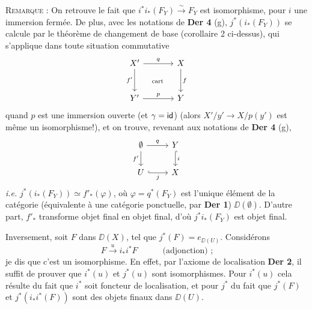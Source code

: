 \noindent\textsc{Remarque} : On retrouve le fait que $i^*i_*(F_Y) \overset{\sim}{\to} F_Y$ est isomorphisme, pour $i$ une immersion fermée. De plus, avec les notations de \textbf{Der 4} (g), $j^*(i_*(F_Y))$ se calcule par le théorème de changement de base (corollaire 2 ci-dessus), qui s'applique dans toute situation commutative
\[
\begin{tikzcd}[row sep=large, column sep=large]
X' \arrow[r, "q"] \arrow[d, "f'"'] \arrow[dr, phantom, "\text{\scriptsize cart}"] & X \arrow[d, "f"] \\
Y' \arrow[r, "p"] & Y
\end{tikzcd}
\]
quand $p$ est une immersion ouverte (et $\gamma = \mathsf{id}$) (alors $X'/y' \to X/p(y')$ est même un isomorphisme!), et on trouve, revenant aux notations de \textbf{Der 4} (g),
\[
\begin{tikzcd}
\emptyset \arrow[r, "q"] \arrow[d, "f'"'] & Y \arrow[d, hook, "i"] \\
U \arrow[r, hook, "j"'] & X
\end{tikzcd}
\]
\textit{i.e.} $j^*(i_*(F_Y)) \simeq f'_*(\varphi)$, où $\varphi = q^*(F_Y)$ est l'unique élément de la catégorie (équivalente à une catégorie ponctuelle, par \textbf{Der 1}) $\DD(\emptyset)$. D'autre part, $f'_*$ transforme objet final en objet final, d'où $j^*i_*(F_Y)$ est objet final.

Inversement, soit $F$ dans $\DD(X)$, tel que $j^*(F) = e_{\DD(U)}$. Considérons
\[
F \xrightarrow{u} i_*i^*F \qquad\quad \text{(adjonction) ;}
\]
je dis que c'est un isomorphisme. En effet, par l'axiome  de localisation \textbf{Der 2}, il suffit de prouver que $i^*(u)$ et $j^*(u)$ sont isomorphismes. Pour $i^*(u)$ cela résulte du fait que $i^*$ soit foncteur de localisation, et pour $j^*$ du fait que $j^*(F)$ et $j^*(i_*i^*(F))$ sont des objets finaux dans $\DD(U)$.


\noindent{}

